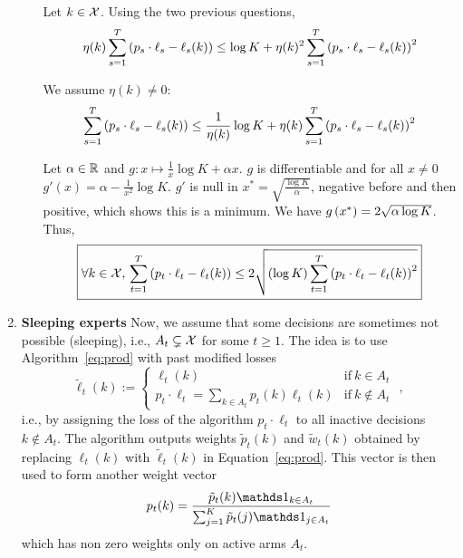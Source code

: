\begin{enumerate}[resume]
\begin{enumerate}[label=(\alph*)]
        \begin{solution}
        Let $k \in \mathcal{X}$. Using the two previous questions,
                \begin{equation*}
                    \eta(k) \sum_{s=1}^T \left( p_s \cdot \ell_s - \ell_s(k) \right) \leq \log K + \eta(k)^2 \sum_{s=1}^T \left( p_s \cdot \ell_s - \ell_s(k) \right)^2
                \end{equation*}
                
                We assume $\eta(k) \neq 0$:
                \begin{equation*}
                    \sum_{s=1}^T \left( p_s \cdot \ell_s - \ell_s(k) \right) \leq \frac{1}{\eta(k)} \log K + \eta(k) \sum_{s=1}^T \left( p_s \cdot \ell_s - \ell_s(k) \right)^2
                \end{equation*}
                
                Let $\alpha \in \mathbb{R}$ and $g: x \mapsto \frac{1}{x} \log K + \alpha x$. $g$ is differentiable and for all $x \neq 0$ $g'(x) = \alpha - \frac{1}{x^2} \log K$. $g'$ is null in $x^* = \sqrt{\frac{\log K}{\alpha}}$, negative before and then positive, which shows this is a minimum. We have $g \left( x^* \right) = 2 \sqrt{\alpha \log K}$. Thus,
                \begin{equation*}
                    \boxed{\forall k \in \mathcal{X},\, \sum_{t=1}^T \left( p_t \cdot \ell_t - \ell_t(k) \right) \leq 2 \sqrt{\left( \log K \right) \sum_{t=1}^T \left( p_t \cdot \ell_t - \ell_t(k) \right)^2}}
                \end{equation*}
        \end{solution}
    \end{enumerate}

	\item {\bfseries Sleeping experts} 
	Now, we assume that some decisions are sometimes not possible (sleeping), i.e., $A_t \subsetneq \mathcal{X}$ for some $t\geq 1$. The idea is to use Algorithm~\eqref{eq:prod} with past modified losses
	\begin{equation*}
		\tilde \ell_t(k) := \left\{ \begin{array}{ll} \ell_t(k) & \text{if} \ k \in A_t \\ p_t \cdot \ell_t = \sum_{k \in A_t} p_t(k) \ell_t(k) & \text{if} \ k \notin A_t \end{array} \right.\,\,,
	\end{equation*}
	i.e., by assigning the loss of the algorithm $p_t \cdot \ell_t$ to all inactive decisions $k \notin A_t$.
	The algorithm outputs weights $\tilde p_t(k)$ and $\tilde w_t(k)$ obtained by replacing $\ell_t(k)$ with $\tilde \ell_t(k)$ in Equation~\eqref{eq:prod}. This vector is then used to form another weight vector
	\begin{equation*}
		p_t(k) = \frac{\tilde p_t(k) \indic_{k\in A_t}}{\sum_{j=1}^K \tilde p_t(j) \indic_{j \in A_t}}
	\end{equation*}
	which has non zero weights only on active arms $A_t$.


\end{enumerate}
